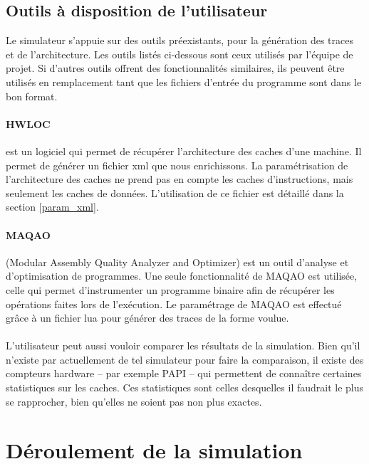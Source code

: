 \subsection{Outils à disposition de l'utilisateur}

Le simulateur s'appuie sur des outils préexistants, pour la génération des traces et de l'architecture. Les outils listés ci-dessous sont ceux utilisés par l'équipe de projet. Si d'autres outils offrent des fonctionnalités similaires, ils peuvent être utilisés en remplacement tant que les fichiers d'entrée du programme sont dans le bon format.

\paragraph{HWLOC} est un logiciel qui permet de récupérer l'architecture des caches d'une machine. Il permet de générer un fichier xml que nous enrichissons. La paramétrisation de l'architecture des caches ne prend pas en compte les caches d'instructions, mais seulement les caches de données. L'utilisation de ce fichier est détaillé dans la section \ref{param_xml}.

\paragraph{MAQAO} (Modular Assembly Quality Analyzer and Optimizer) est un outil d'analyse et d'optimisation de programmes. Une seule fonctionnalité de \textsf{MAQAO} est utilisée, celle qui permet d'instrumenter un programme binaire afin de récupérer les opérations faites lors de l'exécution. Le paramétrage de \textsf{MAQAO} est effectué grâce à un fichier lua pour générer des traces de la forme voulue.

\paragraph{}
L'utilisateur peut aussi vouloir comparer les résultats de la simulation. Bien qu'il n'existe par actuellement de tel simulateur pour faire la comparaison, il existe des compteurs hardware -- par exemple \textsf{PAPI} -- qui permettent de connaître certaines statistiques sur les caches. Ces statistiques sont celles desquelles il faudrait le plus se rapprocher, bien qu'elles ne soient pas non plus exactes.

\section{Déroulement de la simulation}

